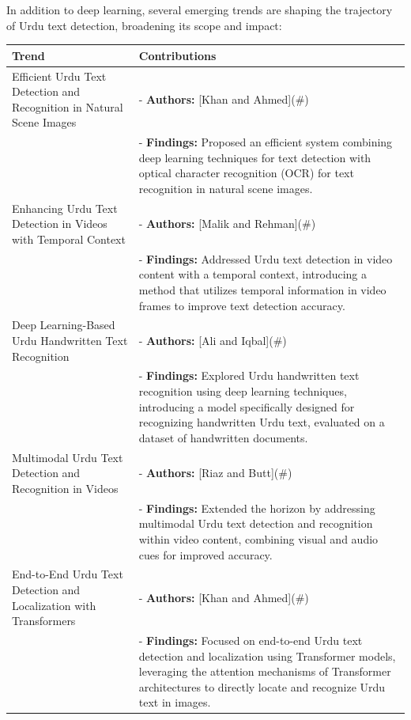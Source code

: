 \documentclass[default,iicol]{sn-jnl}%
\begin{document}
In addition to deep learning, several emerging trends are shaping the trajectory of Urdu text detection, broadening its scope and impact:

\begin{center}
	\begin{tabular}{|p{3cm}|p{6cm}|}
		\hline
		\textbf{Trend} & \textbf{Contributions} \\
		\hline
		Efficient Urdu Text Detection and Recognition in Natural Scene Images & 
		- \textbf{Authors:} [Khan and Ahmed](\#) \\
		& - \textbf{Findings:} Proposed an efficient system combining deep learning techniques for text detection with optical character recognition (OCR) for text recognition in natural scene images. \\
		\hline
		Enhancing Urdu Text Detection in Videos with Temporal Context & 
		- \textbf{Authors:} [Malik and Rehman](\#) \\
		& - \textbf{Findings:} Addressed Urdu text detection in video content with a temporal context, introducing a method that utilizes temporal information in video frames to improve text detection accuracy. \\
		\hline
		Deep Learning-Based Urdu Handwritten Text Recognition & 
		- \textbf{Authors:} [Ali and Iqbal](\#) \\
		& - \textbf{Findings:} Explored Urdu handwritten text recognition using deep learning techniques, introducing a model specifically designed for recognizing handwritten Urdu text, evaluated on a dataset of handwritten documents. \\
		\hline
		Multimodal Urdu Text Detection and Recognition in Videos & 
		- \textbf{Authors:} [Riaz and Butt](\#) \\
		& - \textbf{Findings:} Extended the horizon by addressing multimodal Urdu text detection and recognition within video content, combining visual and audio cues for improved accuracy. \\
		\hline
		End-to-End Urdu Text Detection and Localization with Transformers & 
		- \textbf{Authors:} [Khan and Ahmed](\#) \\
		& - \textbf{Findings:} Focused on end-to-end Urdu text detection and localization using Transformer models, leveraging the attention mechanisms of Transformer architectures to directly locate and recognize Urdu text in images. \\
		\hline
	\end{tabular}
\end{center}
\end{document}
